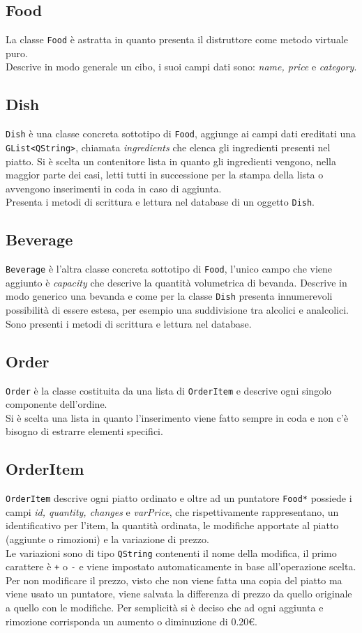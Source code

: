 \documentclass[]{report}   %
\begin{document}
\subsection{Food}
La classe \texttt{Food} è astratta in quanto presenta il distruttore come metodo virtuale puro.\\
Descrive in modo generale un cibo, i suoi campi dati sono:  \textit{name, price} e \textit{category}.
\subsection{Dish}
\texttt{Dish} è una classe concreta sottotipo di \texttt{Food}, aggiunge ai campi dati ereditati una \texttt{GList<QString>}, chiamata \textit{ingredients} che elenca gli ingredienti presenti nel piatto. Si è scelta un contenitore lista in quanto gli ingredienti vengono, nella maggior parte dei casi, letti tutti in successione per la stampa della lista o avvengono inserimenti in coda in caso di aggiunta.\\
Presenta i metodi di scrittura e lettura nel database di un oggetto \texttt{Dish}.
\subsection{Beverage}
\texttt{Beverage} è l'altra classe concreta sottotipo di \texttt{Food}, l'unico campo che viene aggiunto è \textit{capacity} che descrive la quantità volumetrica di bevanda. Descrive in modo generico una bevanda e come per la classe \texttt{Dish} presenta innumerevoli possibilità di essere estesa, per esempio una suddivisione tra alcolici e analcolici.\\
Sono presenti i metodi di scrittura e lettura nel database.
\subsection{Order}
\texttt{Order} è la classe costituita da una lista di \texttt{OrderItem} e descrive ogni singolo componente dell'ordine.\\
Si è scelta una lista in quanto l'inserimento viene fatto sempre in coda e non c'è bisogno di estrarre elementi specifici.
\subsection{OrderItem}
\texttt{OrderItem} descrive ogni piatto ordinato e oltre ad un puntatore \texttt{Food*} possiede i campi \textit{id, quantity, changes} e \textit{varPrice}, che rispettivamente rappresentano, un identificativo per l'item, la quantità ordinata, le modifiche apportate al piatto (aggiunte o rimozioni) e la variazione di prezzo.\\
Le variazioni sono di tipo \texttt{QString} contenenti il nome della modifica, il primo carattere è \texttt{+} o \texttt{-} e viene impostato automaticamente in base all'operazione scelta.\\
Per non modificare il prezzo, visto che non viene fatta una copia del piatto ma viene usato un puntatore, viene salvata la differenza di prezzo da quello originale a quello con le modifiche. Per semplicità si è deciso che ad ogni aggiunta e rimozione corrisponda un aumento o diminuzione di 0.20€.
\end{document}
